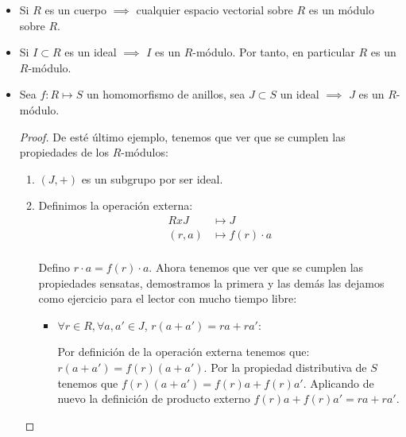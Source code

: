 \begin{example}
	\begin{itemize}
		\item Si $R$ es un cuerpo $\implies$ cualquier espacio vectorial sobre $R$ es un módulo sobre $R$.
		\item Si $I \subset R$ es un ideal $\implies$ $I$ es un $R$-módulo. Por tanto, en particular $R$ es un $R$-módulo.
		\item Sea $f: R \longmapsto S$ un homomorfismo de anillos, sea $J \subset S$ un ideal $\implies$ $J$ es un $R$-módulo.
		\begin{proof}
			De esté último ejemplo, tenemos que ver que se cumplen las propiedades de los $R$-módulos:
			\begin{enumerate}
				\item $(J,+)$ es un subgrupo por ser ideal.
				\item Definimos la operación externa:
				\begin{align*}
					RxJ & \longmapsto  J \\
					(r,a) & \longmapsto  f(r)\cdot a \\
				\end{align*}
				
				Defino $r\cdot a=f(r)\cdot a$. Ahora tenemos que ver que se cumplen las propiedades sensatas, demostramos la primera y las demás las dejamos como ejercicio para el lector con mucho tiempo libre:
				\begin{itemize}
					\item $\forall r \in R, \forall a,a' \in J$, $r(a+a')=ra+ra'$:
					
					Por definición de la operación externa tenemos que: $r(a+a')=f(r)(a+a')$. Por la propiedad distributiva de $S$ tenemos que $f(r)(a+a')=f(r)a+f(r)a'$. Aplicando de nuevo la definición de producto externo $f(r)a+f(r)a'=ra+ra'$.
				\end{itemize}
			\end{enumerate}
		\end{proof}
	\end{itemize}
\end{example}

